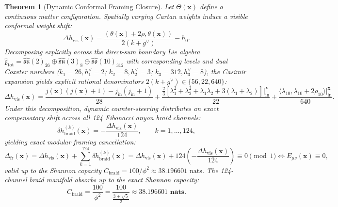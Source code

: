 \documentclass[11pt,onecolumn]{article}
\newtheorem{theorem}{Theorem}
\begin{document}
\begin{theorem}[Dynamic Conformal Framing Closure]
Let $\Theta(\mathbf{x})$ define a continuous matter configuration. Spatially varying Cartan weights induce a visible conformal weight shift:
\begin{equation}
\Delta h_{\text{vis}}(\mathbf{x}) = \frac{(\theta(\mathbf{x}) + 2\rho, \theta(\mathbf{x}))}{2(k + g^\vee)} - h_0.
\label{eq:sugawara_conformal_shift}
\end{equation}
Decomposing explicitly across the direct-sum boundary Lie algebra $\hat{\mathfrak{g}}_{\text{tot}} = \hat{\mathfrak{su}}(2)_{26} \oplus \hat{\mathfrak{su}}(3)_8 \oplus \hat{\mathfrak{so}}(10)_{312}$ with corresponding levels and dual Coxeter numbers ($k_1=26, h_1^\vee=2$; $k_2=8, h_2^\vee=3$; $k_3=312, h_3^\vee=8$), the Casimir expansion yields explicit rational denominators $2(k+g^\vee) \in \{56, 22, 640\}$:
\begin{equation}
\Delta h_{\text{vis}}(\mathbf{x}) = \frac{j(\mathbf{x})(j(\mathbf{x}) + 1) - j_{\text{in}}(j_{\text{in}} + 1)}{28} + \frac{\frac{2}{3}\left[\lambda_1^2 + \lambda_2^2 + \lambda_1\lambda_2 + 3(\lambda_1 + \lambda_2)\right]\Big|_{\text{in}}^{\mathbf{x}}}{22} + \frac{\langle \lambda_{10}, \lambda_{10} + 2\rho_{10} \rangle\Big|_{\text{in}}^{\mathbf{x}}}{640}.
\label{eq:sugawara_casimir_expansion}
\end{equation}
Under this decomposition, dynamic counter-steering distributes an exact compensatory shift across all 124 Fibonacci anyon braid channels:
\begin{equation}
\delta h_{\text{braid}}^{(k)}(\mathbf{x}) = -\frac{\Delta h_{\text{vis}}(\mathbf{x})}{124}, \qquad k = 1, \dots, 124,
\label{eq:braid_framing_compensation}
\end{equation}
yielding exact modular framing cancellation:
\begin{equation}
\Delta_{\text{fr}}(\mathbf{x}) = \Delta h_{\text{vis}}(\mathbf{x}) + \sum_{k=1}^{124} \delta h_{\text{braid}}^{(k)}(\mathbf{x}) = \Delta h_{\text{vis}}(\mathbf{x}) + 124 \left(-\frac{\Delta h_{\text{vis}}(\mathbf{x})}{124}\right) \equiv 0 \pmod 1 \iff E_{\mu\nu}(\mathbf{x}) \equiv 0,
\label{eq:exact_framing_cancellation}
\end{equation}
valid up to the Shannon capacity $C_{\text{braid}} = 100/\phi^2 \approx 38.196601\text{ nats}$.
The 124-channel braid manifold absorbs up to the exact Shannon capacity:
\begin{equation}
C_{\text{braid}} = \frac{100}{\phi^2} = \frac{100}{\frac{3+\sqrt{5}}{2}} \approx \mathbf{38.196601\text{ nats}}.

\end{equation}
\end{theorem}
\end{document}
